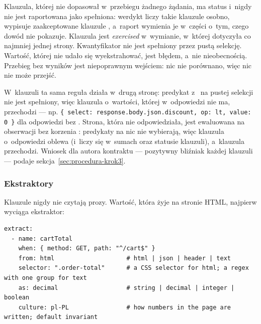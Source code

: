  Klauzula, której  nie dopasował
w~przebiegu żadnego żądania, ma status  i~nigdy nie jest raportowana jako
spełniona: werdykt liczy takie klauzule osobno,  wypisuje zaakceptowane
klauzule , a~raport wymienia je w~części o~tym, czego dowód nie
pokazuje. Klauzula jest \emph{exercised} w~wymianie, w~której dotyczyła co najmniej jednej
strony. Kwantyfikator  nie jest spełniony przez pustą selekcję. Wartość, której
nie udało się wyekstrahować, jest błędem, a~nie nieobecnością. Przebieg bez wyników jest
niepoprawnym wejściem: nic nie porównano, więc nic nie może przejść.

W~klauzuli  ta sama reguła działa w~drugą stronę: predykat z~ na
pustej selekcji nie jest spełniony, więc klauzula  o~wartości, której
w~odpowiedzi nie ma, przechodzi --- np. \texttt{\{ select: response.body.json.discount, op: lt,
value: 0 \}} dla odpowiedzi bez . Strona, która nie odpowiedziała, jest
ewaluowana na obserwacji bez korzenia : predykaty na 
nic nie wybierają, więc klauzula  o~odpowiedzi oblewa (i~liczy się w~sumach
oraz statusie klauzuli), a~klauzula  przechodzi. Wniosek dla autora kontraktu
--- pozytywny bliźniak każdej klauzuli  --- podaje
sekcja~\ref{sec:procedura-krok3}.

\subsubsection{Ekstraktory}

Klauzule nigdy nie czytają prozy. Wartość, która żyje na stronie HTML, najpierw wyciąga
ekstraktor:

\begin{lstlisting}
extract:
  - name: cartTotal
    when: { method: GET, path: "^/cart$" }
    from: html                    # html | json | header | text
    selector: ".order-total"      # a CSS selector for html; a regex with one group for text
    as: decimal                   # string | decimal | integer | boolean
    culture: pl-PL                # how numbers in the page are written; default invariant
\end{lstlisting}

